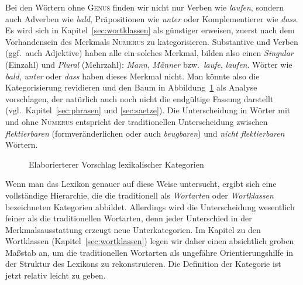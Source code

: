 
Bei den Wörtern ohne \textsc{Genus} finden wir nicht nur Verben wie \textit{laufen}, sondern auch Adverben wie \textit{bald}, Präpositionen wie \textit{unter} oder Komplementierer wie \textit{dass}.
Es wird sich in Kapitel~\ref{sec:wortklassen} als günstiger erweisen, zuerst nach dem Vorhandensein des Merkmals \textsc{Numerus} zu kategorisieren.
Substantive und Verben (ggf.\ auch Adjektive) haben alle ein solches Merkmal, bilden also einen \textit{Singular} (Einzahl) und \textit{Plural} (Mehrzahl): \textit{Mann}, \textit{Männer} bzw.\ \textit{laufe}, \textit{laufen}.
Wörter wie \textit{bald}, \textit{unter} oder \textit{dass} haben dieses Merkmal nicht.
Man könnte also die Kategorisierung revidieren und den Baum in Abbildung~\ref{fig:lexkat2} als Analyse vorschlagen, der natürlich auch noch nicht die endgültige Fassung darstellt (vgl.\ Kapitel~\ref{sec:phrasen} und \ref{sec:saetze}).
Die Unterscheidung in Wörter mit und ohne \textsc{Numerus} entspricht der traditionellen Unterscheidung zwischen \textit{flektierbaren} (formveränderlichen oder auch \textit{beugbaren}) und \textit{nicht flektierbaren} Wörtern.

\begin{figure}
  \centering
  \caption{Elaborierterer Vorschlag lexikalischer Kategorien}
  \label{fig:lexkat2}
\end{figure}


Wenn man das Lexikon genauer auf diese Weise untersucht, ergibt sich eine vollständige Hierarchie, die die traditionell als \textit{Wortarten} oder \textit{Wortklassen} bezeichneten Kategorien abbildet.
Allerdings wird die Unterscheidung wesentlich feiner als die traditionellen Wortarten, denn jeder Unterschied in der Merkmalsausstattung erzeugt neue Unterkategorien.
Im Kapitel zu den Wortklassen (Kapitel~\ref{sec:wortklassen}) legen wir daher einen absichtlich groben Maßstab an, um die traditionellen Wortarten als ungefähre Orientierungshilfe in der Struktur des Lexikons zu rekonstruieren.
Die Definition der Kategorie ist jetzt relativ leicht zu geben.

